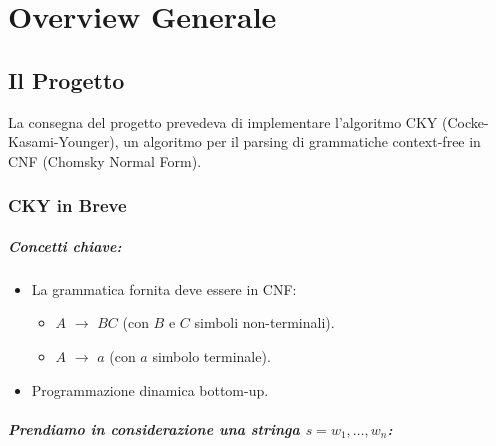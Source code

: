 \chapter{Overview Generale}

\section{Il Progetto}

La consegna del progetto prevedeva di implementare l'algoritmo CKY (Cocke-Kasami-Younger), un algoritmo per il parsing di grammatiche context-free in CNF (Chomsky Normal Form).

\subsection{CKY in Breve}

\paragraph{Concetti chiave:}

\begin{itemize}
  \item La grammatica fornita deve essere in CNF:
    \begin{itemize}
      \item $A$ $\rightarrow$ $B C$ (con $B$ e $C$ simboli non-terminali). 
      \item $A$ $\rightarrow$ $a$ (con $a$ simbolo terminale). 
    \end{itemize}
  \item Programmazione dinamica bottom-up.
\end{itemize}


\paragraph{Prendiamo in considerazione una stringa $s = w_1,\dots, w_n$:}

